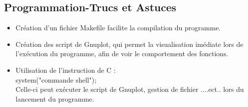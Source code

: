 \documentclass{book}
\begin{document}
\subsection{Programmation-Trucs et Astuces}
\begin{itemize}
\item Création d'un fichier Makefile facilite la compilation du programme.
\item Création des script de Gnuplot, qui permet la visualisation imédiate lors de l'exécution du programme, afin de voir le comportement des fonctions.
\item Utilisation de l'instruction de C :\\ 
	\hspace{2cm} system("commande shell"); \\Celle-ci peut exécuter le script de Gnuplot, gestion de fichier ....ect.. lors du lancement du programme.
\end{itemize}
\end{document}
